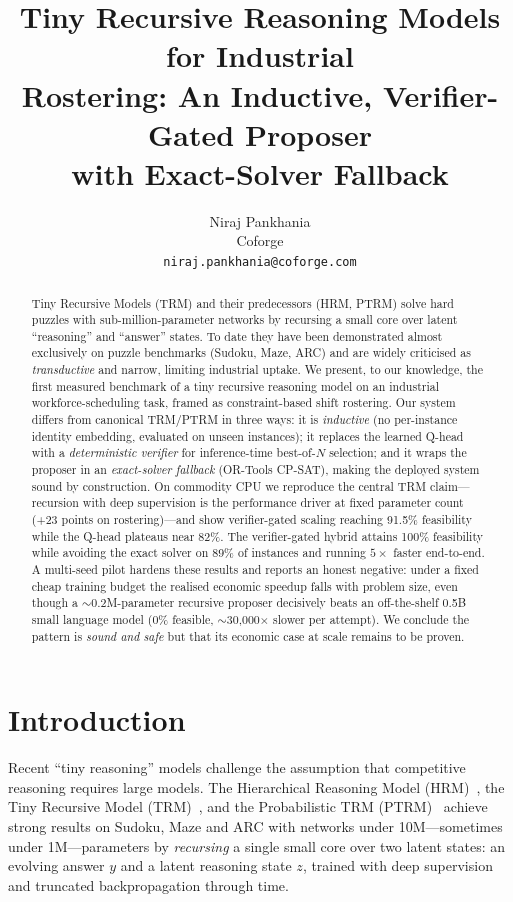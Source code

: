 \documentclass{article}
\title{Tiny Recursive Reasoning Models for Industrial\\
Rostering: An Inductive, Verifier-Gated Proposer\\
with Exact-Solver Fallback}
\author{%
  Niraj Pankhania \\
  Coforge \\
  \texttt{niraj.pankhania@coforge.com} \\
}
\begin{document}
\maketitle

\begin{abstract}
Tiny Recursive Models (TRM) and their predecessors (HRM, PTRM) solve hard puzzles
with sub-million-parameter networks by recursing a small core over latent
``reasoning'' and ``answer'' states. To date they have been demonstrated almost
exclusively on puzzle benchmarks (Sudoku, Maze, ARC) and are widely criticised as
\emph{transductive} and narrow, limiting industrial uptake. We present, to our
knowledge, the first measured benchmark of a tiny recursive reasoning model on an
industrial workforce-scheduling task, framed as constraint-based shift rostering.
Our system differs from canonical TRM/PTRM in three ways: it is \emph{inductive}
(no per-instance identity embedding, evaluated on unseen instances); it replaces
the learned Q-head with a \emph{deterministic verifier} for inference-time
best-of-$N$ selection; and it wraps the proposer in an \emph{exact-solver
fallback} (OR-Tools CP-SAT), making the deployed system sound by construction. On
commodity CPU we reproduce the central TRM claim---recursion with deep
supervision is the performance driver at fixed parameter count (+23 points on
rostering)---and show verifier-gated scaling reaching 91.5\% feasibility while the
Q-head plateaus near 82\%. The verifier-gated hybrid attains 100\% feasibility
while avoiding the exact solver on 89\% of instances and running
$5\times$ faster end-to-end. A multi-seed pilot hardens these results and reports
an honest negative: under a fixed cheap training budget the realised economic
speedup falls with problem size, even though a $\sim$0.2M-parameter recursive
proposer decisively beats an off-the-shelf 0.5B small language model (0\%
feasible, $\sim$30{,}000$\times$ slower per attempt). We conclude the pattern is
\emph{sound and safe} but that its economic case at scale remains to be proven.
\end{abstract}

\section{Introduction}

Recent ``tiny reasoning'' models challenge the assumption that competitive
reasoning requires large models. The Hierarchical Reasoning Model
(HRM)~\cite{hrm}, the Tiny Recursive Model (TRM)~\cite{trm}, and the Probabilistic
TRM (PTRM)~\cite{ptrm} achieve strong results on Sudoku, Maze and ARC with
networks under 10M---sometimes under 1M---parameters by \emph{recursing} a single
small core over two latent states: an evolving answer $y$ and a latent reasoning
state $z$, trained with deep supervision and truncated backpropagation through
time.
\end{document}
